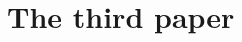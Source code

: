 \chapter{The third paper}
\label{ch:third_paper}


\begingroup
\endgroup


\chapabstract{
    \lipsum[1]
}

\lipsum[1-5]
